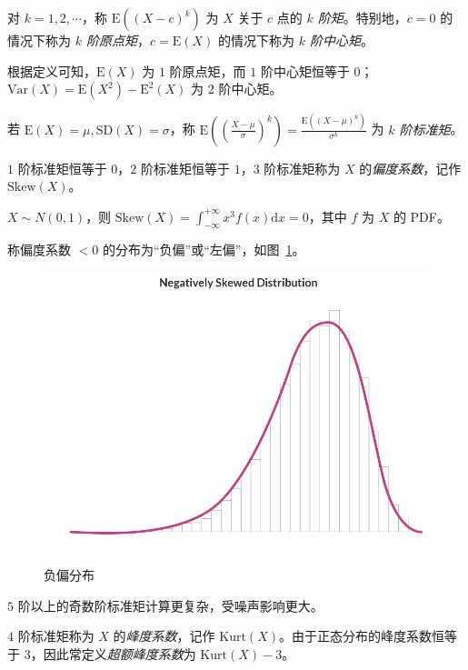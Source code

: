 \documentclass[../main.tex]{subfiles}
\begin{document}
\begin{definition}\label{def:4.5.1}
    对 $k=1,2,\cdots$，称 $\mathrm E((X-c)^k)$ 为 $X$ 关于 $c$ 点的 \emph{$k$ 阶矩}。特别地，$c=0$ 的情况下称为 \emph{$k$ 阶原点矩}，$c=\mathrm E(X)$ 的情况下称为 \emph{$k$ 阶中心矩}。
\end{definition}

根据定义可知，$\mathrm E(X)$ 为 $1$ 阶原点矩，而 $1$ 阶中心矩恒等于 $0$；$\mathrm{Var}(X)=\mathrm E(X^2)-\mathrm E^2(X)$ 为 $2$ 阶中心矩。

若 $\mathrm E(X)=\mu,\mathrm{SD}(X)=\sigma$，称 $\mathrm E((\frac{X-\mu}\sigma)^k)=\frac{\mathrm E((X-\mu)^k)}{\sigma^k}$ 为 \emph{$k$ 阶标准矩}。

$1$ 阶标准矩恒等于 $0$，$2$ 阶标准矩恒等于 $1$，$3$ 阶标准矩称为 $X$ 的\emph{偏度系数}，记作 $\mathrm{Skew}(X)$。

\begin{example}
    $X\sim N(0,1)$，则 $\mathrm{Skew}(X)=\int_{-\infty}^{+\infty}x^3f(x)\mathrm dx=0$，其中 $f$ 为 $X$ 的 PDF。
\end{example}

称偏度系数 $<0$ 的分布为“负偏”或“左偏”，如图~\ref{fig:4.5.1}。

\begin{figure}[!ht]
    \centering
    \includegraphics[scale=0.2]{figures/negative_skew.png}
    \caption{负偏分布}
    \label{fig:4.5.1}
\end{figure}

$5$ 阶以上的奇数阶标准矩计算更复杂，受噪声影响更大。

$4$ 阶标准矩称为 $X$ 的\emph{峰度系数}，记作 $\mathrm{Kurt}(X)$。由于正态分布的峰度系数恒等于 $3$，因此常定义\emph{超额峰度系数}为 $\mathrm{Kurt}(X)-3$。
\end{document}

